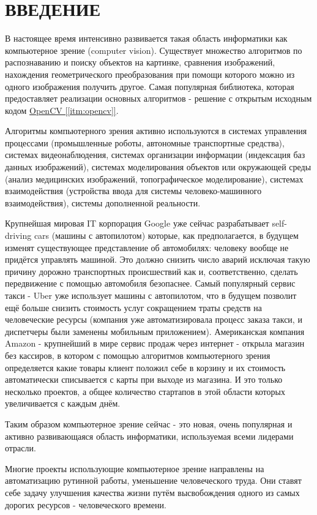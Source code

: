 \chapter*{ВВЕДЕНИЕ}

В настоящее время интенсивно развивается такая область информатики как компьютерное зрение (computer vision). Существует множество алгоритмов по распознаванию и поиску объектов на картинке, сравнения изображений, нахождения геометрического преобразования при помощи которого можно из одного изображения получить другое. Самая популярная библиотека, которая предоставляет реализации основных алгоритмов - решение с открытым исходным кодом \hyperref[itm:opencv]{OpenCV [\ref{itm:opencv}]}.

Алгоритмы компьютерного зрения активно используются в системах управления процессами (промышленные роботы, автономные транспортные средства), системах видеонаблюдения, системах организации информации (индексация баз данных изображений), системах моделирования объектов или окружающей среды (анализ медицинских изображений, топографическое моделирование), системах взаимодействия (устройства ввода для системы человеко-машинного взаимодействия), системы дополненной реальности.

Крупнейшая мировая IT корпорация Google уже сейчас разрабатывает self-driving cars (машины с автопилотом) которые, как предполагается, в будущем изменят существующее представление об автомобилях: человеку вообще не придётся управлять машиной. Это должно снизить число аварий исключая такую причину дорожно транспортных происшествий как  и, соответственно, сделать передвижение с помощью автомобиля безопаснее. Самый популярный сервис такси - Uber уже использует машины с автопилотом, что в будущем позволит ещё больше снизить стоимость услуг сокращением траты средств на человеческие ресурсы (компания уже автоматизировала процесс заказа такси, и диспетчеры были заменены мобильным приложением). Американская компания Amazon - крупнейший в мире сервис продаж через интернет - открыла магазин без кассиров, в котором с помощью алгоритмов компьютерного зрения определяется какие товары клиент положил себе в корзину и их стоимость автоматически списывается с карты при выходе из магазина. И это только несколько проектов, а общее количество стартапов в этой области которых увеличивается с каждым днём.

Таким образом компьютерное зрение сейчас - это новая, очень популярная и активно развивающаяся область информатики, используемая всеми лидерами отрасли.

Многие проекты использующие компьютерное зрение направлены на автоматизацию рутинной работы, уменьшение человеческого труда. Они ставят себе задачу улучшения качества жизни путём высвобождения одного из самых дорогих ресурсов - человеческого времени.

\newpage